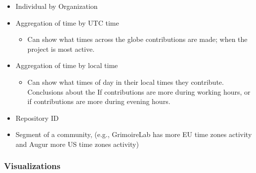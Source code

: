 \begin{itemize}
\tightlist
\item
  Individual by Organization
\item
  Aggregation of time by UTC time

  \begin{itemize}
  \tightlist
  \item
    Can show what times across the globe contributions are made; when
    the project is most active.
  \end{itemize}
\item
  Aggregation of time by local time

  \begin{itemize}
  \tightlist
  \item
    Can show what times of day in their local times they contribute.
    Conclusions about the If contributions are more during working
    hours, or if contributions are more during evening hours.
  \end{itemize}
\item
  Repository ID
\item
  Segment of a community, (e.g., GrimoireLab has more EU time zones
  activity and Augur more US time zones activity)
\end{itemize}

\hypertarget{visualizations}{%
\subsubsection{Visualizations}\label{visualizations}}


